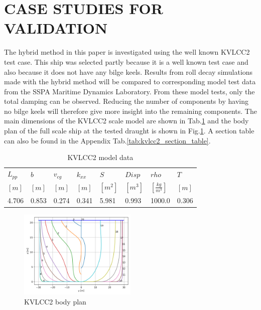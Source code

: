 \section*{CASE STUDIES FOR VALIDATION}\label{case-studies-for-validation}
\label{se:validation}
The hybrid method in this paper is investigated using the well known
KVLCC2 test case. This ship was selected partly because it is a well
known test case and also because it does not have any bilge keels.
Results from roll decay simulations made with the hybrid method will be
compared to corresponding model test data from the SSPA Maritime
Dynamics Laboratory. From these model tests, only the total damping can
be observed. Reducing the number of components by having no bilge keels
will therefore give more insight into the remaining components. The main
dimensions of the KVLCC2 scale model are shown in
Tab.\ref{tab:kvlcc2_model_data} and the body plan of the full
scale ship at the tested draught is shown in
Fig.\ref{fig:body_plan}. A section table can also be found in
the Appendix Tab.\ref{tab:kvlcc2_section_table}.
\begin{table}[H]
\scriptsize
\center
\caption{KVLCC2 model data}
\label{tab:kvlcc2_model_data}
\begin{tabular}{|l|l|l|l|l|l|l|l|}
\hline\addlinespace
$L_{pp}$ & $b$ & $v_{cg}$ & $k_{xx}$ & $S$ & $Disp$ & $rho$ & $T$\\
$[m]$ & $[m]$ & $[m]$ & $[m]$ & $[m^2]$ & $[m^3]$ & $\left[\frac{kg}{m^3}\right]$ & $[m]$\\
\hline4.706 & 0.853 & 0.274 & 0.341 & 5.981 & 0.993 & 1000.0 & 0.306\\
\hline
\end{tabular}
\end{table}
\begin{figure}[H]
\begin{center}\includegraphics[width = 0.5\textwidth]{figures/body_plan.png}\end{center}
\vspace{-1cm}
\caption{KVLCC2 body plan}
\label{fig:body_plan}
\end{figure}
